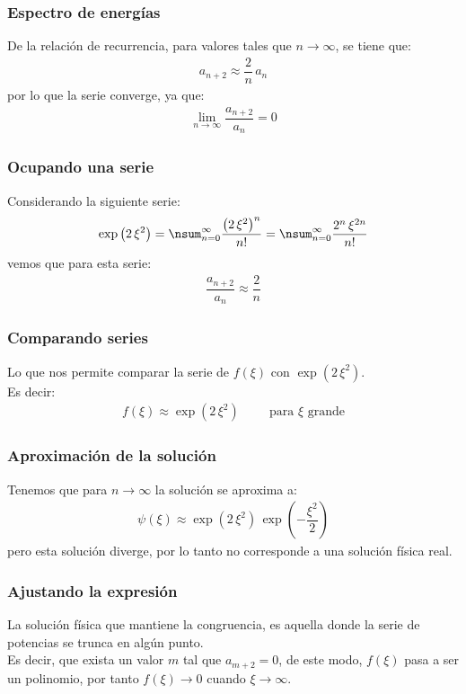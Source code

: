 \documentclass[12pt]{beamer}
\begin{document}
\begin{frame}
\frametitle{Espectro de energías}
De la relación de recurrencia, para valores tales que $n \to \infty$, se tiene que:
\pause
\begin{align*}
a_{n+2} \approx \dfrac{2}{n} \, a_{n}
\end{align*}
\pause
por lo que la serie converge, ya que:
\pause
\begin{align*}
\displaystyle{\lim_{n \to \infty}} \dfrac{a_{n+2}}{a_{n}} = 0
\end{align*}
\end{frame}
\begin{frame}
\frametitle{Ocupando una serie}
Considerando la siguiente serie:
\pause
\begin{align*}
\exp \left( 2 \, \xi^{2} \right) = \nsum_{n=0}^{\infty} \dfrac{\left( 2 \, \xi^{2} \right)^{n}}{n!} = \nsum_{n=0}^{\infty} \dfrac{2^{n} \, \xi^{2n}}{n!}
\end{align*}
vemos que para esta serie:
\begin{align*}
\dfrac{a_{n+2}}{a_{n}} \approx \dfrac{2}{n}
\end{align*}
\end{frame}
\begin{frame}
\frametitle{Comparando series}
Lo que nos permite comparar la serie de $f(\xi)$ con $\exp( 2 \, \xi^{2})$.
\pause
\\
\bigskip
Es decir:
\begin{align*}
f(\xi) \approx \exp \left( 2 \, \xi^{2} \right) \hspace{1cm} \mbox{para $\xi$ grande}
\end{align*}
\end{frame}
\begin{frame}
\frametitle{Aproximación de la solución}
Tenemos que para $n \to \infty$ la solución se aproxima a:
\pause
\begin{align*}
\psi(\xi) \approx \exp \left( 2 \, \xi^{2}  \right) \, \exp \left( - \dfrac{\xi^{2}}{2} \right)
\end{align*}
\pause
pero esta solución diverge, por lo tanto no corresponde a una solución física real.
\end{frame}
\begin{frame}
\frametitle{Ajustando la expresión}
La solución física que mantiene la congruencia, es aquella donde la serie de potencias se trunca en algún punto.
\\
\bigskip
\pause
Es decir, que exista un valor $m$ tal que $a_{m+2} = 0$, de este modo, $f(\xi)$ pasa a ser un polinomio, \pause por tanto $f(\xi) \to 0$ cuando $\xi \to \infty$.
\end{frame}
\end{document}
